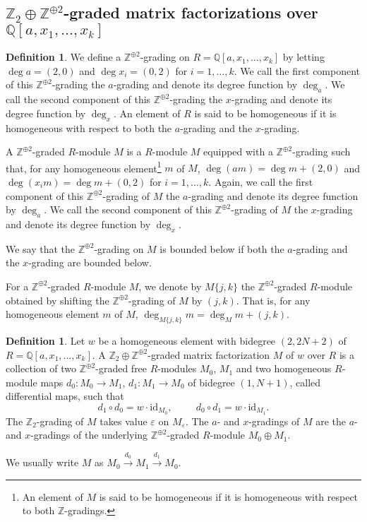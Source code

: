 \documentclass{amsart}
\theoremstyle{plain}
\theoremstyle{definition}
\newtheorem{definition}[theorem]{Definition}
\theoremstyle{remark}
\numberwithin{equation}{section}
\begin{document}
\subsection{${\mathbb{Z}}_2\oplus{\mathbb{Z}}^{\oplus 2}$-graded matrix factorizations over ${\mathbb{Q}}[a,x_1,\dots,x_k]$}

\begin{definition}\label{def-bigrading-ring}
We define a ${\mathbb{Z}}^{\oplus2}$-grading on $R={\mathbb{Q}}[a,x_1,\dots,x_k]$ by letting $\deg a = (2,0)$ and $\deg x_i =(0,2)$ for $i=1,\dots, k$. We call the first component of this ${\mathbb{Z}}^{\oplus2}$-grading the $a$-grading and denote its degree function by $\deg_a$. We call the second component of this ${\mathbb{Z}}^{\oplus2}$-grading the $x$-grading and denote its degree function by $\deg_x$. An element of $R$ is said to be homogeneous if it is homogeneous with respect to both the $a$-grading and the $x$-grading.

A ${\mathbb{Z}}^{\oplus2}$-graded $R$-module $M$ is a $R$-module $M$ equipped with a ${\mathbb{Z}}^{\oplus2}$-grading such that, for any homogeneous element\footnote{An element of $M$ is said to be homogeneous if it is homogeneous with respect to both ${\mathbb{Z}}$-gradings.} $m$ of $M$, $\deg (am) = \deg m + (2,0)$ and $\deg (x_i m) = \deg m +(0,2)$ for $i=1,\dots, k$. Again, we call the first component of this ${\mathbb{Z}}^{\oplus2}$-grading of $M$ the $a$-grading and denote its degree function by $\deg_a$. We call the second component of this ${\mathbb{Z}}^{\oplus2}$-grading of $M$ the $x$-grading and denote its degree function by $\deg_x$. 

We say that the ${\mathbb{Z}}^{\oplus2}$-grading on $M$ is bounded below if both the $a$-grading and the $x$-grading are bounded below.

For a ${\mathbb{Z}}^{\oplus2}$-graded $R$-module $M$, we denote by $M\{j,k\}$ the ${\mathbb{Z}}^{\oplus2}$-graded $R$-module obtained by shifting the ${\mathbb{Z}}^{\oplus2}$-grading of $M$ by $(j,k)$. That is, for any homogeneous element $m$ of $M$, $\deg_{M\{j,k\}} m = \deg_M m + (j,k)$.
\end{definition}

\begin{definition}\label{def-mf}
Let $w$ be a homogeneous element with bidegree $(2,2N+2)$ of $R={\mathbb{Q}}[a,x_1,\dots,x_k]$. A ${\mathbb{Z}}_2\oplus{\mathbb{Z}}^{\oplus2}$-graded matrix factorization $M$ of $w$ over $R$ is a collection of two ${\mathbb{Z}}^{\oplus2}$-graded free $R$-modules $M_0$, $M_1$ and two homogeneous $R$-module maps $d_0:M_0\rightarrow M_1$, $d_1:M_1\rightarrow M_0$ of bidegree $(1,N+1)$, called differential maps, such that 
\[
d_1 \circ d_0=w\cdot{\mathrm{id}}_{M_0}, \hspace{1cm}  d_0 \circ d_1=w\cdot{\mathrm{id}}_{M_1}.
\]
The ${\mathbb{Z}}_2$-grading of $M$ takes value ${\varepsilon}$ on $M_{\varepsilon}$. The $a$- and $x$-gradings of $M$ are the $a$- and $x$-gradings of the underlying ${\mathbb{Z}}^{\oplus 2}$-graded $R$-module $M_0 \oplus M_1$.

We usually write $M$ as $M_0 \xrightarrow{d_0} M_1 \xrightarrow{d_1} M_0$.
\end{definition}
\end{document}
